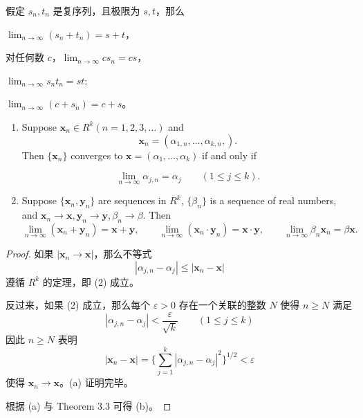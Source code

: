 \documentclass[../poma-notes.tex]{subfiles}
\begin{document}
\begin{anote}
  假定 ${s_n}, {t_n}$ 是复序列，且极限为 $s, t$，那么
  \begin{enumerate*}[label=(\alph*)]
    \item $\lim_{n \to \infty}(s_n + t_n) = s + t$，
    \item 对任何数 $c$，$\lim_{n \to \infty} cs_n = cs$，
    \item $\lim_{n \to \infty} s_n t_n = st$;
    \item $\lim_{n \to \infty}(c + s_n) = c + s$。
  \end{enumerate*}
\end{anote}

\begin{theorem}
  \begin{enumerate}[label=(\alph*)]
    \item Suppose $\mathbf{x}_n \in R^k (n=1,2,3,\dots)$ and
          \[\mathbf{x}_n = (\alpha_{1,n},\dots,\alpha_{k,n},).\]
          Then $\{\mathbf{x}_n\}$ converges to $\mathbf{x}=(\alpha_1,\dots,\alpha_k)$ if and only if
          \begin{center}
            \begin{equation}
              \lim_{n \to \infty} \alpha_{j,n} = \alpha_j \qquad (1 \le j \le k).
            \end{equation}
          \end{center}
    \item Suppose $\{\mathbf{x}_n,\mathbf{y}_n\}$ are sequences in $R^k$, $\{\beta_n\}$ is a sequence of real numbers,
          and $\mathbf{x}_n \to \mathbf{x}, \mathbf{y}_n \to \mathbf{y}, \beta_n \to \beta$. Then
          \[
            \lim_{n \to \infty} (\mathbf{x}_n + \mathbf{y}_n) = \mathbf{x} + \mathbf{y}, \qquad
            \lim_{n \to \infty} (\mathbf{x}_n \cdot \mathbf{y}_n) = \mathbf{x} \cdot \mathbf{y} , \qquad
            \lim_{n \to \infty} \beta_n \mathbf{x}_n = \beta \mathbf{x}.
          \]
  \end{enumerate}
\end{theorem}

\begin{proof}
  如果 $|\mathbf{x}_n \to \mathbf{x}|$，那么不等式
  \[|\alpha_{j,n} - \alpha_j| \le |\mathbf{x}_n - \mathbf{x}|\]
  遵循 $R^k$ 的定理，即 (2) 成立。

  反过来，如果 (2) 成立，那么每个 $\varepsilon > 0$ 存在一个关联的整数 $N$ 使得 $n \ge N$ 满足
  \[|\alpha_{j,n} - \alpha_j| < \frac{\varepsilon}{\sqrt{k}} \qquad (1 \le j \le k)\]
  因此 $n \ge N$ 表明
  \[|\mathbf{x}_n - \mathbf{x}| = \biggl\{\sum_{j = 1}^{k} |\alpha_{j,n} - \alpha_j|^2\biggr\}^{1/2} < \varepsilon\]
  使得 $\mathbf{x}_n \to \mathbf{x}$。(a) 证明完毕。

  根据 (a) 与 Theorem 3.3 可得 (b)。
\end{proof}
\end{document}
